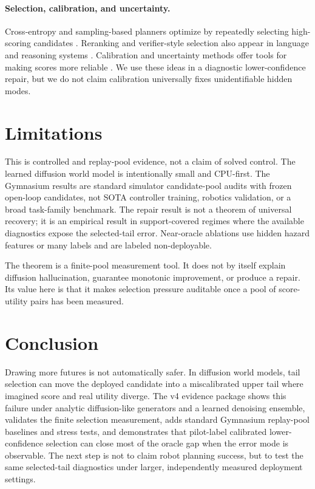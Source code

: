 \documentclass{article}
\begin{document}
\paragraph{Selection, calibration, and uncertainty.}
Cross-entropy and sampling-based planners optimize by repeatedly selecting high-scoring candidates \citep{rubinstein1999crossentropy,williams2017mppi}. Reranking and verifier-style selection also appear in language and reasoning systems \citep{cobbe2021verifiers,lightman2024letsverify}. Calibration and uncertainty methods offer tools for making scores more reliable \citep{lakshminarayanan2017deepensembles,guo2017calibration,vovk2005algorithmic,angelopoulos2021gentle}. We use these ideas in a diagnostic lower-confidence repair, but we do not claim calibration universally fixes unidentifiable hidden modes.

\section{Limitations}

This is controlled and replay-pool evidence, not a claim of solved control. The learned diffusion world model is intentionally small and CPU-first. The Gymnasium results are standard simulator candidate-pool audits with frozen open-loop candidates, not SOTA controller training, robotics validation, or a broad task-family benchmark. The repair result is not a theorem of universal recovery; it is an empirical result in support-covered regimes where the available diagnostics expose the selected-tail error. Near-oracle ablations use hidden hazard features or many labels and are labeled non-deployable.

The theorem is a finite-pool measurement tool. It does not by itself explain diffusion hallucination, guarantee monotonic improvement, or produce a repair. Its value here is that it makes selection pressure auditable once a pool of score-utility pairs has been measured.

\section{Conclusion}

Drawing more futures is not automatically safer. In diffusion world models, tail selection can move the deployed candidate into a miscalibrated upper tail where imagined score and real utility diverge. The v4 evidence package shows this failure under analytic diffusion-like generators and a learned denoising ensemble, validates the finite selection measurement, adds standard Gymnasium replay-pool baselines and stress tests, and demonstrates that pilot-label calibrated lower-confidence selection can close most of the oracle gap when the error mode is observable. The next step is not to claim robot planning success, but to test the same selected-tail diagnostics under larger, independently measured deployment settings.
\end{document}

